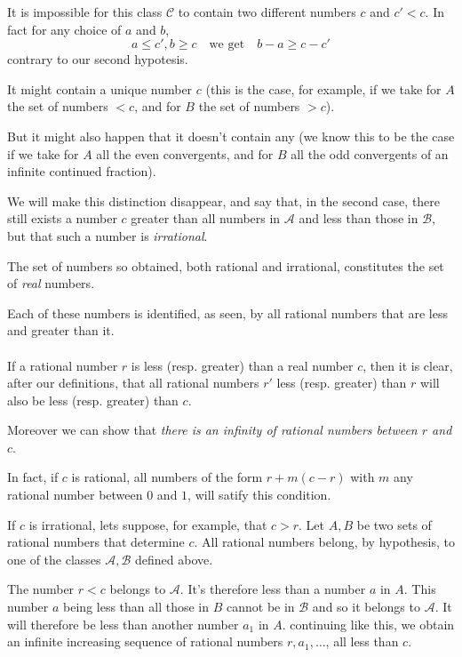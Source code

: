 \documentclass[10pt,letterpaper]{book}
\theoremstyle{definition}
\begin{document}
It is impossible for this class $\mathcal C$ to contain two different numbers $c$ and $c' < c$. In fact for any choice of $a$ and $b$,
\[
  a\leq c', b\geq c\quad\mbox{we get}\quad b-a\geq c-c'
\]
contrary to our second hypotesis.

It might contain a unique number $c$ (this is the case, for example, if we take for $A$ the set of numbers $< c$, and for $B$ the set of numbers $> c$).

But it might also happen that it doesn't contain any (we know this to be the case if we take for $A$ all the even convergents, and for $B$ all the odd convergents of an infinite continued fraction).

We will make this distinction disappear, and say that, in the second case, there still exists a number $c$ greater than all numbers in $\mathcal A$ and less than those in $\mathcal B$, but that such a number is \textit{irrational}.

The set of numbers so obtained, both rational and irrational, constitutes the set of \textit{real} numbers.


Each of these numbers is identified, as seen, by all rational numbers that are less and greater than it.

\paragraph{} If a rational number $r$ is less (resp. greater) than a real number $c$, then it is clear, after our definitions, that all rational numbers $r'$ less (resp. greater) than $r$ will also be less (resp. greater) than $c$.

Moreover we can show that \textit{there is an infinity of rational numbers between $r$ and $c$}.

In fact, if $c$ is rational, all numbers of the form $r+m(c-r)$ with $m$ any rational number between $0$ and $1$, will satify this condition.

If $c$ is irrational, lets suppose, for example, that $c > r$. Let $A, B$ be two sets of rational numbers that determine $c$. All rational numbers belong, by hypothesis, to one of the classes $\mathcal A, \mathcal B$ defined above.

The number $r < c$ belongs to $\mathcal A$. It's therefore less than a number $a$ in $A$. This number $a$ being less than all those in $B$ cannot be in $\mathcal B$ and so it belongs to $\mathcal A$. It will therefore be less than another number $a_1$ in $A$. continuing like this, we obtain an infinite increasing sequence of rational numbers $r, a_1, \dots$, all less than $c$.
\end{document}
